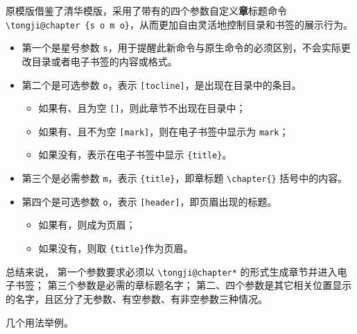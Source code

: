 \documentclass[../Main/thesis.tex]{subfiles}
\begin{document}
原模版借鉴了清华模版，采用了带有的四个参数自定义\textbf{章}标题命令 \texttt{\textbackslash{}tongji@chapter \{s\ o\ m\ o\}}，从而更加自由灵活地控制目录和书签的展示行为。

\begin{itemize}
\item 第一个是星号参数 \texttt{s}，用于提醒此新命令与原生命令的必须区别，不会实际更改目录或者电子书签的内容或格式。
\item 第二个是可选参数 \texttt{o}，表示 \texttt{[tocline]}，是出现在目录中的条目。
\begin{itemize}
  \item 如果有、且为空 \texttt{[]}，则此章节不出现在目录中；
  \item 如果有、且不为空 \texttt{[mark]}，则在电子书签中显示为 \texttt{mark}；
  \item 如果没有，表示在电子书签中显示 \texttt{\{title\}}。
  \end{itemize}
\item 第三个是必需参数 \texttt{m}，表示 \texttt{\{title\}}，即章标题 \texttt{\textbackslash{}chapter\{\}} 括号中的内容。
\item 第四个是可选参数 \texttt{o}，表示 \texttt{[header]}，即页眉出现的标题。
\begin{itemize}
  \item 如果有，则成为页眉；
  \item 如果没有，则取 \texttt{\{title\}}作为页眉。
\end{itemize}
\end{itemize}

总结来说， 第一个参数要求必须以 \texttt{\textbackslash{}tongji@chapter*}
的形式生成章节并进入电子书签； 第三个参数是必需的章标题名字；
第二、四个参数是其它相关位置显示的名字，且区分了无参数、有空参数、有非空参数三种情况。

几个用法举例。
\end{document}
